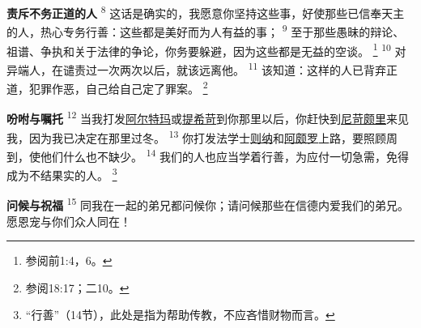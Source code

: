 \textbf{责斥不务正道的人\quad}
\textsuperscript{8}
这话是确实的，我愿意你坚持这些事，好使那些已信奉天主的人，热心专务行善：这些都是美好而为人有益的事；
\textsuperscript{9}
至于那些愚昧的辩论、祖谱、争执和关于法律的争论，你务要躲避，因为这些都是无益的空谈。
\footnote{参阅前1:4，6。}
\textsuperscript{10}
对异端人，在谴责过一次两次以后，就该远离他。
\textsuperscript{11}
该知道：这样的人已背弃正道，犯罪作恶，自己给自己定了罪案。
\footnote{参阅18:17；二10。}

\textbf{吩咐与嘱托\quad}
\textsuperscript{12}
当我打发\uline{阿尔特玛}或\uline{提希苛}到你那里以后，你赶快到\uline{尼苛颇里}来见我，因为我已决定在那里过冬。
\textsuperscript{13}
你打发法学士\uline{则纳}和\uline{阿颇罗}上路，要照顾周到，使他们什么也不缺少。
\textsuperscript{14}
我们的人也应当学着行善，为应付一切急需，免得成为不结果实的人。
\footnote{“行善”（14节），此处是指为帮助传教，不应吝惜财物而言。}

\textbf{问候与祝福\quad}
\textsuperscript{15}
同我在一起的弟兄都问候你；请问候那些在信德内爱我们的弟兄。愿恩宠与你们众人同在！
